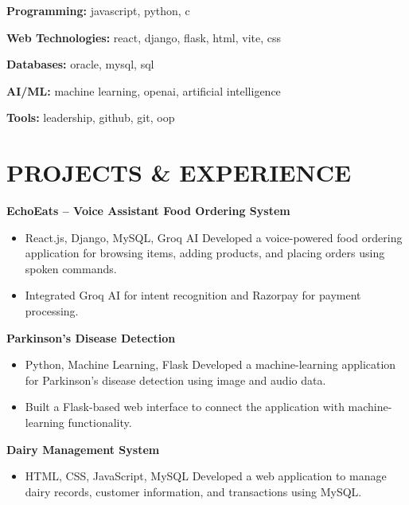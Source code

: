\documentclass[9pt,a4paper]{extarticle}
\begin{document}
\textbf{Programming:} javascript, python, c

\textbf{Web Technologies:} react, django, flask, html, vite, css

\textbf{Databases:} oracle, mysql, sql

\textbf{AI/ML:} machine learning, openai, artificial intelligence

\textbf{Tools:} leadership, github, git, oop


\section*{PROJECTS \& EXPERIENCE}

\noindent \textbf{EchoEats – Voice Assistant Food Ordering System}\vspace{1pt}\\
\begin{itemize}[leftmargin=*, parsep=0pt, itemsep=1pt, topsep=1pt]
    \item React.js, Django, MySQL, Groq AI Developed a voice-powered food ordering application for browsing items, adding products, and placing orders using spoken commands.
    \item Integrated Groq AI for intent recognition and Razorpay for payment processing.
\end{itemize}

\noindent \textbf{Parkinson’s Disease Detection}\vspace{1pt}\\
\begin{itemize}[leftmargin=*, parsep=0pt, itemsep=1pt, topsep=1pt]
    \item Python, Machine Learning, Flask Developed a machine-learning application for Parkinson’s disease detection using image and audio data.
    \item Built a Flask-based web interface to connect the application with machine-learning functionality.
\end{itemize}

\noindent \textbf{Dairy Management System}\vspace{1pt}\\
\begin{itemize}[leftmargin=*, parsep=0pt, itemsep=1pt, topsep=1pt]
    \item HTML, CSS, JavaScript, MySQL Developed a web application to manage dairy records, customer information, and transactions using MySQL.
\end{itemize}
\end{document}
